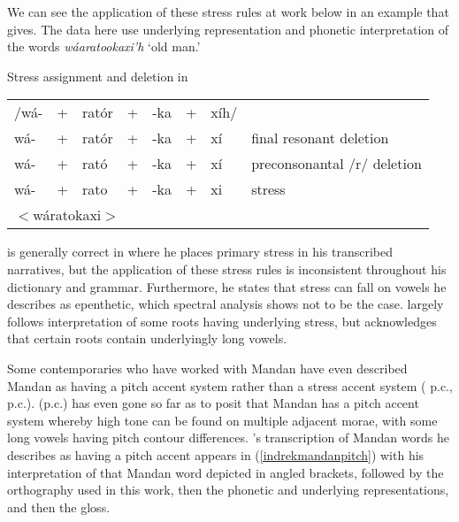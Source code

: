 We can see the application of these stress rules at work below in an example that \citet[50]{hollow1970} gives. The data here use \citeauthor{hollow1970} underlying representation and phonetic interpretation of the words \textit{wáaratookaxi'h} `old man.'

\begin{exe}

\item\label{hollowrules} Stress assignment and deletion in \citet{hollow1970}

\begin{tabular}{llllllll}
/wá-& +&
	ratór& +&
	-ka& +&
	xíh/&\\
wá-& +&
	ratór& +&
	-ka& +&
	xí&	final resonant deletion\\
wá-& +&
	rató& +&
	-ka& +&
	xí&	preconsonantal /r/ deletion\\
wá-& +&
	rato& +&
	-ka& +&
	xi&	stress\\
\multicolumn{8}{l}{$<$wáratokaxi$>$}
\end{tabular}
\end{exe}

\citet{hollow1970} is generally correct in where he places primary stress in his transcribed narratives, but the application of these stress rules is inconsistent throughout his dictionary and grammar. Furthermore, he states that stress can fall on vowels he describes as epenthetic, which spectral analysis shows not to be the case. \citet{mixco1997a} largely follows  interpretation of some roots having underlying stress, but acknowledges that certain roots contain underlyingly long vowels.

Some contemporaries who have worked with Mandan have even described Mandan as having a pitch accent system rather than a stress accent system (\citeauthor{boyle2007} p.c., \citeauthor{park2012} p.c.). \citeauthor{park2012} (p.c.) has even gone so far as to posit that Mandan has a pitch accent system whereby high tone can be found on multiple adjacent morae, with some long vowels having pitch contour differences. \citeauthor{park2012}'s transcription of Mandan words he describes as having a pitch accent appears in (\ref{indrekmandanpitch}) with his interpretation of that Mandan word depicted in angled brackets, followed by the orthography used in this work, then the phonetic and underlying representations, and then the gloss.

